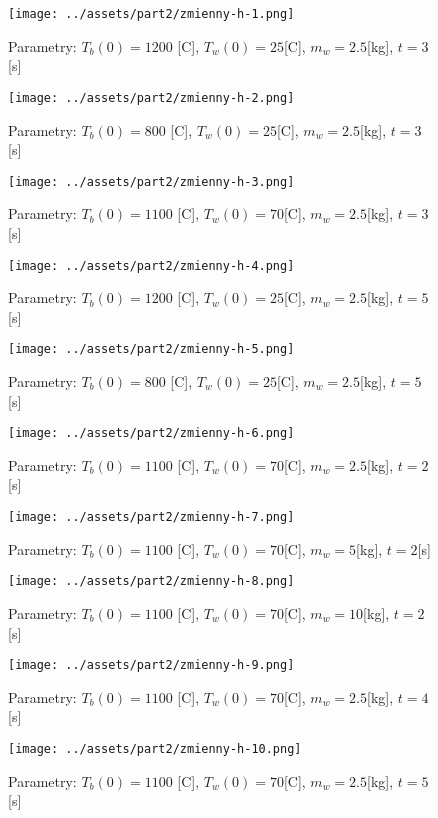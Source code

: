 \documentclass[
	12pt, %
]{fphw}
\begin{document}
\begin{figure}[H]
	\texttt{[image: ../assets/part2/zmienny-h-1.png]}
	\caption{Parametry: \(T_b(0) = 1200\) [\textdegree{}C], \(T_w(0) = 25\)[\textdegree{}C], \(m_w = 2.5\)[kg], \(t = 3\)[s]}

	\texttt{[image: ../assets/part2/zmienny-h-2.png]}
	\caption{Parametry: \(T_b(0) = 800\) [\textdegree{}C], \(T_w(0) = 25\)[\textdegree{}C], \(m_w = 2.5\)[kg], \(t = 3\)[s]}
\end{figure}


\begin{figure}[H]
	\texttt{[image: ../assets/part2/zmienny-h-3.png]}
	\caption{Parametry: \(T_b(0) = 1100\) [\textdegree{}C], \(T_w(0) = 70\)[\textdegree{}C], \(m_w = 2.5\)[kg], \(t = 3\)[s]}

	\texttt{[image: ../assets/part2/zmienny-h-4.png]}
	\caption{Parametry: \(T_b(0) = 1200\) [\textdegree{}C], \(T_w(0) = 25\)[\textdegree{}C], \(m_w = 2.5\)[kg], \(t = 5\)[s]}
\end{figure}

\begin{figure}[H]
	\texttt{[image: ../assets/part2/zmienny-h-5.png]}
	\caption{Parametry: \(T_b(0) = 800\) [\textdegree{}C], \(T_w(0) = 25\)[\textdegree{}C], \(m_w = 2.5\)[kg], \(t = 5\)[s]}

	\texttt{[image: ../assets/part2/zmienny-h-6.png]}
	\caption{Parametry: \(T_b(0) = 1100\) [\textdegree{}C], \(T_w(0) = 70\)[\textdegree{}C], \(m_w = 2.5\)[kg], \(t = 2\)[s]}
\end{figure}

\begin{figure}[H]
	\texttt{[image: ../assets/part2/zmienny-h-7.png]}
	\caption{Parametry: \(T_b(0) = 1100\) [\textdegree{}C], \(T_w(0) = 70\)[\textdegree{}C], \(m_w = 5\)[kg], \(t = 2\)[s]}

	\texttt{[image: ../assets/part2/zmienny-h-8.png]}
	\caption{Parametry: \(T_b(0) = 1100\) [\textdegree{}C], \(T_w(0) = 70\)[\textdegree{}C], \(m_w = 10\)[kg], \(t = 2\)[s]}
\end{figure}

\begin{figure}[H]
	\texttt{[image: ../assets/part2/zmienny-h-9.png]}
	\caption{Parametry: \(T_b(0) = 1100\) [\textdegree{}C], \(T_w(0) = 70\)[\textdegree{}C], \(m_w = 2.5\)[kg], \(t = 4\)[s]}

	\texttt{[image: ../assets/part2/zmienny-h-10.png]}
	\caption{Parametry: \(T_b(0) = 1100\) [\textdegree{}C], \(T_w(0) = 70\)[\textdegree{}C], \(m_w = 2.5\)[kg], \(t = 5\)[s]}
\end{figure}
\end{document}
